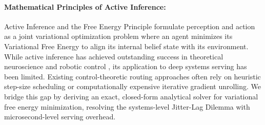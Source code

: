 \paragraph{Mathematical Principles of Active Inference:}
Active Inference and the Free Energy Principle \cite{friston2006, friston2010} formulate perception and action as a joint variational optimization problem where an agent minimizes its Variational Free Energy to align its internal belief state with its environment. While active inference has achieved outstanding success in theoretical neuroscience and robotic control \cite{millidge2020neural, safron2020active}, its application to deep systems serving has been limited. Existing control-theoretic routing approaches often rely on heuristic step-size scheduling or computationally expensive iterative gradient unrolling. We bridge this gap by deriving an exact, closed-form analytical solver for variational free energy minimization, resolving the systems-level Jitter-Lag Dilemma with microsecond-level serving overhead.
